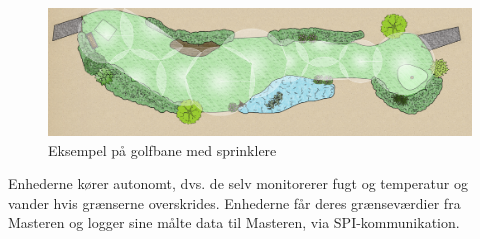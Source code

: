 \begin{figure}[H]
  \centering
    \includegraphics[width=\textwidth]{billeder/hul_med_sprinkler}
    \caption{Eksempel på golfbane med sprinklere}
    \label{fig:hul_med_sprinkler}
\end{figure}

Enhederne kører autonomt, dvs. de selv monitorerer fugt og temperatur og vander hvis grænserne overskrides. Enhederne får deres grænseværdier fra Masteren og logger sine målte data til Masteren, via SPI-kommunikation.